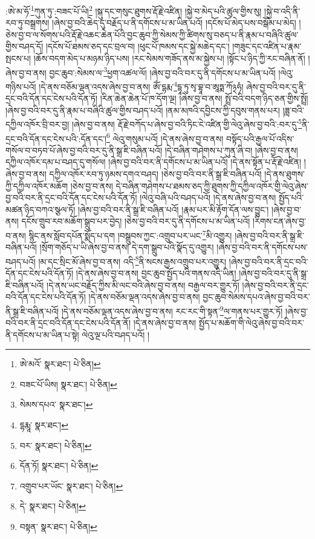 :ཨེ་མ་ཧོ་\footnote{ཨེ་མའོ་  སྣར་ཐང་།  པེ་ཅིན། }ཀུན་ཏུ་:བཟང་པོ་ཡི།\footnote{བཟང་པོ་ཡིས།  སྣར་ཐང་།  པེ་ཅིན། } །སྐུ་དང་གསུང་ཐུགས་རྡོ་རྗེ་འཛིན། །སྐྱེ་བ་མེད་པའི་ཚུལ་གྱིས་སུ། །སྐྱེ་བ་འདི་ནི་རབ་ཏུ་བསྒྲགས། །ཞེས་བྱ་བའི་ཆེད་དུ་བརྗོད་པ་ནི་དགོངས་པ་མ་ཡིན་པའོ། །དངོས་པོ་མེད་པས་བསྒོམ་པ་མེད། །ཅེས་བྱ་བ་ལ་སོགས་པའི་རྡོ་རྗེ་འཆང་ཆེན་པོའི་བྱང་ཆུབ་ཀྱི་སེམས་ཀྱི་ཚིགས་སུ་བཅད་པ་ནི་རྣམ་པ་བཞིའི་ཚུལ་གྱིས་བཤད་དོ། །དངོས་པོ་ཐམས་ཅད་དང་བྲལ་བ། །ཕུང་པོ་ཁམས་དང་སྐྱེ་མཆེད་དང་། །གཟུང་དང་འཛིན་པ་རྣམ་སྤངས་པ། །ཆོས་བདག་མེད་པ་མཉམ་ཉིད་པས། །རང་སེམས་གཟོད་ནས་མ་སྐྱེས་པ། །སྟོང་པ་ཉིད་ཀྱི་རང་བཞིན་ནོ། །ཞེས་བྱ་བ་ནས། བྱང་ཆུབ་:སེམས་ལ་\footnote{སེམས་དཔའ་  སྣར་ཐང་། }ཕྱག་འཚལ་ལོ། །ཞེས་བྱ་བའི་བར་དུ་ནི་དགོངས་པ་མ་ཡིན་པའོ། །ལེའུ་གཉིས་པའོ། །དེ་ནས་བཅོམ་ལྡན་འདས་ཞེས་བྱ་བ་ནས། ཨོཾ་དྷརྨ་\footnote{དྷརྨཱ་  སྣར་ཐང་། }དྷཱ་ཏུ་སྭ་བྷཱ་བ་ཨཱཏྨ་ཀོ྅ཧཾ། ཞེས་བྱ་བའི་བར་དུ་ནི་དྲང་བའི་དོན་དང་ངེས་པའི་དོན་ཏོ། །རིན་ཆེན་ཆེན་པོ་ཁ་དོག་ལྔ། །ཞེས་བྱ་བ་ནས། སྤྲོ་བའི་བདག་ཉིད་ཅན་གྱིས་སྤྲོ། །ཞེས་བྱ་བའི་བར་དུ་ནི་རྣམ་པ་བཞིའི་ཚུལ་གྱིས་བཤད་པའོ། །ནམ་མཁའི་དབྱིངས་ཀྱི་དབུས་གནས་པར། །ཟླ་བའི་དཀྱིལ་འཁོར་བྲི་བར་བྱ། །ཞེས་བྱ་བ་ནས། རྡོ་རྗེ་བཀོད་པ་ཞེས་བྱ་བའི་ཏིང་ངེ་འཛིན་གྱི་ལེའུ་ཞེས་བྱ་བའི་:བར་དུ་\footnote{བར་  སྣར་ཐང་།  པེ་ཅིན། }ནི་དྲང་བའི་དོན་དང་ངེས་པའི་:དོན་དང་།\footnote{དོན་ཏོ།  སྣར་ཐང་།  པེ་ཅིན། } ལེའུ་གསུམ་པའོ། །དེ་ནས་ཞེས་བྱ་བ་ནས། བསྟོད་པའི་རྒྱལ་པོ་འདིས་གསོལ་བ་བཏབ་པོ་ཞེས་བྱ་བའི་བར་དུ་ནི་སྒྲ་ཇི་བཞིན་པའོ། །དེ་བཞིན་གཤེགས་པ་ཀུན་ཞི་བ། །ཞེས་བྱ་བ་ནས། དཀྱིལ་འཁོར་དམ་པ་བཤད་དུ་གསོལ། །ཞེས་བྱ་བའི་བར་ནི་དགོངས་པ་མ་ཡིན་པའོ། །དེ་ནས་སྟོན་པ་རྡོ་རྗེ་འཛིན། །ཞེས་བྱ་བ་ནས། དཀྱིལ་འཁོར་རབ་ཏུ་ཉམས་དགའ་བཤད། །ཅེས་བྱ་བའི་བར་ནི་སྒྲ་ཇི་བཞིན་པའོ། །དེ་ནས་ཐུགས་ཀྱི་དཀྱིལ་འཁོར་མཆོག །ཅེས་བྱ་བ་ནས། དེ་བཞིན་གཤེགས་པ་ཐམས་ཅད་ཀྱི་ཐུགས་ཀྱི་དཀྱིལ་འཁོར་གྱི་ལེའུ་ཞེས་བྱ་བའི་བར་ནི་དྲང་བའི་དོན་དང་ངེས་པའི་དོན་ཏོ། །ལེའུ་བཞི་པའི་བཤད་པའོ། །དེ་ནས་ཞེས་བྱ་བ་ནས། སྤྱོད་པའི་མཚན་ཉིད་བཀའ་སྩལ་ཏོ། །ཞེས་བྱ་བའི་བར་ནི་སྒྲ་ཇི་བཞིན་པའོ། །རྣམ་པར་མི་རྟོག་དོན་ལས་བྱུང་། །ཞེས་བྱ་བ་ནས། དངོས་གྲུབ་རབ་མཆོག་སྒྲུབ་པར་བྱེད། །ཅེས་བྱ་བའི་བར་དུ་ནི་དགོངས་པ་མ་ཡིན་པའོ། །རིགས་ངན་ཞེས་བྱ་བ་ནས། སྙིང་ནས་སློབ་དཔོན་སྨོད་པ་དག །བསྒྲུབས་ཀྱང་:འགྲུབ་པར་ཡང་\footnote{འགྲུབ་པར་ཡོང་  སྣར་ཐང་།  པེ་ཅིན། }མི་འགྱུར། །ཞེས་བྱ་བའི་བར་ནི་སྒྲ་ཇི་བཞིན་པའོ། །སྲོག་གཅོད་པ་ཡི་ཞེས་བྱ་བ་ནས། དེ་དག་སྒྲུབ་པའི་སྣོད་དུ་འགྱུར། །ཞེས་བྱ་བའི་བར་ནི་དགོངས་པས་བཤད་པའོ། །མ་དང་སྲིང་མོ་ཞེས་བྱ་བ་ནས། འདི་\footnote{དེ་  སྣར་ཐང་།  པེ་ཅིན། }ནི་སངས་རྒྱས་འགྲུབ་པར་འགྱུར། །ཞེས་བྱ་བའི་བར་ནི་དྲང་བའི་དོན་དང་ངེས་པའི་དོན་ཏོ། །དེ་ནས་ཞེས་བྱ་བ་ནས། བྱང་ཆུབ་སྤྱོད་པའི་གནས་འདི་ཡིན། །ཞེས་བྱ་བའི་བར་དུ་ནི་སྒྲ་ཇི་བཞིན་པའོ། །དེ་ནས་ཡང་བརྗོད་ཀྱིས་མི་ལང་བའི་ཞེས་བྱ་བ་ནས། བརྒྱལ་བར་གྱུར་ཏོ། །ཞེས་བྱ་བའི་བར་ནི་དྲང་བའི་དོན་དང་ངེས་པའི་དོན་ཏོ། །དེ་ནས་བཅོམ་ལྡན་འདས་ཞེས་བྱ་བ་ནས། བྱང་ཆུབ་སེམས་དཔའ་ཞེས་བྱ་བའི་བར་ནི་སྒྲ་ཇི་བཞིན་པའོ། །དེ་ནས་བཅོམ་ལྡན་འདས་ཞེས་བྱ་བ་ནས། རང་རང་གི་སྟན་\footnote{བསྟན་  སྣར་ཐང་།  པེ་ཅིན། }ལ་གནས་པར་གྱུར་ཏོ། །ཞེས་བྱ་བའི་བར་ནི་དྲང་བའི་དོན་དང་ངེས་པའི་དོན་ནོ། །དེ་ནས་ཞེས་བྱ་བ་ནས། སྤྱོད་པ་མཆོག་གི་ལེའུ་ཞེས་བྱ་བའི་བར་ནི་དགོངས་པ་མ་ཡིན་པ་སྟེ། ལེའུ་ལྔ་པའི་བཤད་པའོ། །
